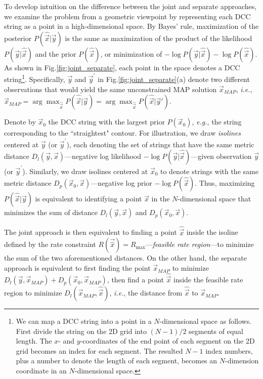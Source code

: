 To develop intuition on the difference between the joint and separate approaches, we examine the problem from a geometric viewpoint by representing each DCC string as a point in a high-dimensional space.
By Bayes' rule, maximization of the posterior $P(\hat{\vec{x}}|\vec{y})$ is the same as maximization of the product of the likelihood $P(\vec{y}|\hat{\vec{x}})$ and the prior $P(\hat{\vec{x}})$, or minimization of $-\log P(\vec{y}|\hat{\vec{x}}) -\log P(\hat{\vec{x}})$.
As shown in Fig.\;\ref{fig:joint_separate}, each point in the space denotes a DCC string\footnote{We can map a DCC string into a point in a $N$-dimensional space as follows. First divide the string on the 2D grid into $(N-1)/2$ segments of equal length. The $x$- and $y$-coordinates of the end point of each segment on the 2D grid becomes an index for each segment. The resulted $N-1$ index numbers, plus a number to denote the length of each segment, becomes an $N$-dimension coordinate in an $N$-dimensional space.}.
Specifically, $\vec{y}$ and $\vec{y}^{\prime}$ in Fig.\;\ref{fig:joint_separate}(a) denote two different observations that would yield the same unconstrained MAP solution $\vec{x}_{MAP}$, \textit{i.e.}, $\vec{x}_{MAP} = \arg \max_{\hat{\vec{x}}} P(\hat{\vec{x}}|\vec{y}) = \arg \max_{\hat{\vec{x}}} P(\hat{\vec{x}}|\vec{y}')$. 

Denote by $\vec{x}_0$ the DCC string with the largest prior $P(\vec{x}_0)$, \textit{e.g.}, the string corresponding to the ``straightest" contour.
For illustration, we draw \textit{isolines} centered at $\vec{y}$ (or $\vec{y}^{\prime}$), each denoting the set of strings that have the same metric distance $D_l(\vec{y},\vec{x})$---negative log likelihood $-\log P(\vec{y}|\hat{\vec{x}})$---given observation $\vec{y}$ (or $\vec{y}^{\prime}$).
Similarly, we draw isolines centered at $\vec{x}_0$ to denote strings with the same metric distance $D_p(\vec{x}_0,\vec{x})$---negative log prior $-\log P(\hat{\vec{x}})$. 
Thus, maximizing $P(\hat{\vec{x}}|\vec{y})$ is equivalent to identifying a point $\vec{x}$ in the $N$-dimensional space that minimizes the sum of distance $D_l(\vec{y},\vec{x})$ and $D_p(\vec{x}_0,\vec{x})$.

The joint approach is then equivalent to finding a point $\hat{\vec{x}}$ inside the isoline defined by the rate constraint $R(\vec{\hat{x}})=R_{\max}$---\textit{feasible rate region}---to minimize the sum of the two aforementioned distances.
On the other hand, the separate approach is equivalent to first finding the point $\vec{x}_{MAP}$ to minimize $D_l(\vec{y},\vec{x}_{MAP}) + D_p(\vec{x}_0,\vec{x}_{MAP})$, then find a point $\hat{\vec{x}}$ inside the feasible rate region to minimize $D_l(\vec{x}_{MAP}, \hat{\vec{x}})$, 
\textit{i.e.}, the distance from $\hat{\vec{x}}$ to $\vec{x}_{MAP}$.

